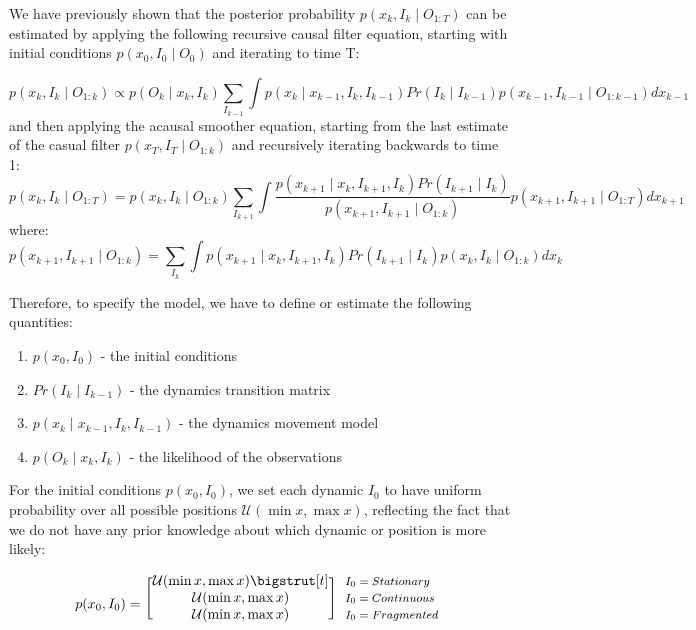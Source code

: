 \documentclass[times, twoside]{zHenriquesLab-StyleBioRxiv}
\begin{document}
We have previously shown \cite{DenovellisCharacterizinghippocampalreplay2019} that the posterior probability $p(x_k, I_k \mid O_{1:T})$ can be estimated by applying the following recursive causal filter equation, starting with initial conditions $p(x_{0}, I_{0} \mid O_{0})$ and iterating to time T:

$$
p(x_{k}, I_{k} \mid O_{1:k}) \propto
p(O_{k}  \mid x_{k}, I_{k}) \sum_{I_{k-1}} \int p(x_{k} \mid x_{k-1}, I_{k}, I_{k-1}) 
Pr(I_{k} \mid I_{k-1}) p(x_{k-1}, I_{k-1} \mid O_{1:k-1}) dx_{k-1}
$$
and then applying the acausal smoother equation, starting from the last estimate of the casual filter $p(x_{T}, I_{T} \mid O_{1:k})$ and recursively iterating backwards to time 1:
$$
p(x_{k}, I_{k} \mid O_{1:T}) =
p(x_{k}, I_{k} \mid O_{1:k})
\sum_{I_{k+1}} \int \frac{p(x_{k+1} \mid x_{k}, I_{k+1}, I_{k})
Pr(I_{k+1} \mid I_{k})}{p(x_{k+1}, I_{k+1} \mid O_{1:k})}
p(x_{k+1}, I_{k+1} \mid O_{1:T}) dx_{k+1}
$$
where:
$$
p(x_{k+1}, I_{k+1} \mid O_{1:k}) =
\sum_{I_{k}} \int p(x_{k+1} \mid x_{k}, I_{k+1}, I_{k}) Pr(I_{k+1} \mid I_{k})
p(x_{k}, I_{k} \mid O_{1:k}) dx_{k}
$$

Therefore, to specify the model, we have to define or estimate the following quantities:
\begin{enumerate}
  \item $p(x_{0}, I_{0})$ - the initial conditions
  \item $Pr(I_{k} \mid I_{k-1})$ - the dynamics transition matrix
  \item $p(x_{k} \mid x_{k-1}, I_{k}, I_{k-1})$ - the dynamics movement model
  \item $p(O_{k}  \mid x_{k}, I_{k})$ - the likelihood of the observations
\end{enumerate}

For the initial conditions $p(x_{0}, I_{0})$, we set each dynamic $I_0$ to have uniform probability over all possible positions $\mathcal{U}(\min x, \max x)$, reflecting the fact that we do not have any prior knowledge about which dynamic or position is more likely:

\begin{equation*}
  p(x_{0}, I_{0}) = 
  \begin{blockarray}{*{1}{c} l}
    \begin{block}{[*{1}{c}]>{$\footnotesize}l<{$}}
      \mathcal{U}(\min x, \max x) \bigstrut[t]& $I_{0} = Stationary$ \\
      \mathcal{U}(\min x, \max x) & $I_{0} = Continuous$ \\
      \mathcal{U}(\min x, \max x) & $I_{0} = Fragmented$ \\
    \end{block}
  \end{blockarray}
\end{equation*}
\end{document}
